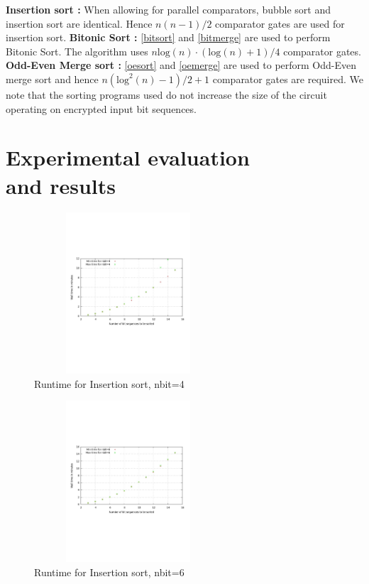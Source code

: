 \documentclass{acm_proc_article-sp}
\begin{document}
\newline \newline
\textbf{Insertion sort :} When allowing for parallel comparators, bubble sort and insertion sort are identical. Hence $n(n-1)/2$ comparator gates are used for insertion sort.\newline \newline
\textbf{Bitonic Sort :} \autoref{bitsort} and \autoref{bitmerge} are used to perform Bitonic Sort. The algorithm uses $n\mathrm{log}(n)·(\mathrm{log}(n)+1)/4$ comparator gates. \newline \newline
\textbf{Odd-Even Merge sort :} \autoref{oesort} and \autoref{oemerge} are used to perform Odd-Even merge sort and hence  $n(\mathrm{log}^{2}(n)-1)/2 + 1 $ comparator gates are required.\newline
We note that the sorting programs used do not increase the size of the circuit operating on encrypted input bit sequences.

\section{Experimental evaluation \\ and results}
\label{Sec:Eval}

\begin{figure}[!h]
\centering
\includegraphics[width=7cm, height=6cm]{fsort3.pdf} 
\caption{Runtime for Insertion sort, nbit=4} 
\label{fig:image_sf3} %
\end{figure}

\begin{figure}[!h] %
\centering
\includegraphics[width=7cm, height=6cm]{fsort4.pdf} 
\caption{Runtime for Insertion sort, nbit=6} 
\label{fig:image_sf4} %
\end{figure}
\end{document}
